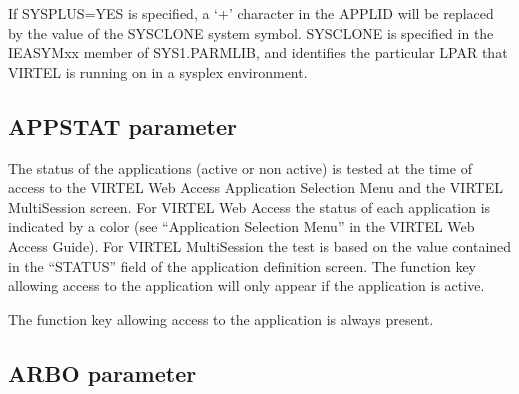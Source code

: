 \documentclass[letterpaper,10pt,english]{sphinxmanual}
\begin{document}
\sphinxAtStartPar
If SYSPLUS=YES is specified, a ‘+’ character in the APPLID will be replaced by the value of the SYSCLONE system symbol. SYSCLONE is specified in the IEASYMxx member of SYS1.PARMLIB, and identifies the particular LPAR that VIRTEL is running on in a sysplex environment.

\ignorespaces 

\subsection{APPSTAT parameter}
\label{\detokenize{Installation_Guide:appstat-parameter}}\label{\detokenize{Installation_Guide:index-36}}
\begin{sphinxVerbatim}[commandchars=\\\{\}]
 
\end{sphinxVerbatim}

\sphinxAtStartPar
{} \sphinxhyphen{} The status of the applications (active or non active) is tested at the time of access to the VIRTEL Web Access Application Selection Menu and the VIRTEL Multi\sphinxhyphen{}Session screen. For VIRTEL Web Access the status of each application is indicated by a color (see “Application Selection Menu” in the VIRTEL Web Access Guide). For VIRTEL Multi\sphinxhyphen{}Session the test is based on the value contained in the “STATUS” field of the application definition screen. The function key allowing access to the application will only appear if the application is active.

\sphinxAtStartPar
{} \sphinxhyphen{} The function key allowing access to the application is always present.

\ignorespaces 

\subsection{ARBO parameter}
\label{\detokenize{Installation_Guide:arbo-parameter}}\label{\detokenize{Installation_Guide:index-37}}
\begin{sphinxVerbatim}[commandchars=\\\{\}]
 
\end{sphinxVerbatim}
\end{document}
